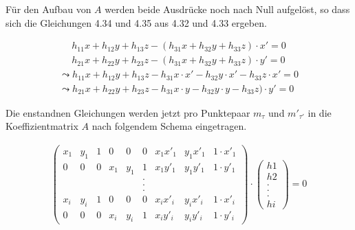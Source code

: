 Für den Aufbau von $A$ werden beide Ausdrücke noch nach Null aufgelöst, so dass sich die Gleichungen 4.34 und 4.35 aus 4.32 und 4.33 ergeben.

\begin{gather}
	h_{11}x+h_{12}y+h_{13}z -(h_{31}x+h_{32}y+h_{33}z) \cdot x'= 0 \\	h_{21}x+h_{22}y+h_{23}z-(h_{31}x+h_{32}y+h_{33}z) \cdot y'=0
\end{gather}
\begin{gather}
	\leadsto h_{11}x+h_{12}y+h_{13}z -h_{31}x\cdot x' - h_{32}y \cdot x'-h_{33}z\cdot x'= 0\\
	\leadsto h_{21}x+h_{22}y+h_{23}z-h_{31}x\cdot y -h_{32}y \cdot y -h_{33}z) \cdot y'=0
\end{gather}

Die enstandnen Gleichungen werden jetzt pro Punktepaar $m_\tau$ und $m'_{\tau'}$ in die Koeffizientmatrix $A$ nach folgendem Schema eingetragen.\cite{Elements,HZ,Schwarz,Heipke}

\begin{gather}
	\begin{pmatrix}
		x_1&y_1&1&0&0&0&x_1 x'_1&y_1 x'_1 & 1\cdot x'_1\\
		0&0&0&x_1&y_1&1&x_1 y'_1&y_1 y'_1 & 1\cdot y'_1\\
		&&&&&.&&&\\	
		&&&&&.&&&\\	
		&&&&&.&&&\\	
		x_i&y_i&1&0&0&0&x_i x'_i&y_i x'_i & 1\cdot x'_i\\
		0&0&0&x_i&y_i&1&x_i y'_i&y_i y'_i & 1\cdot y'_i
	\end{pmatrix}
	\cdot
	\begin{pmatrix}
		h1\\h2\\.\\.\\.\\hi
	\end{pmatrix}
	=0
\end{gather}

